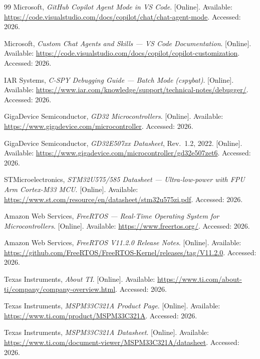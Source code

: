 \documentclass[12pt,a4paper,oneside]{book}
\begin{document}
\begin{thebibliography}{99}
Microsoft, \emph{GitHub Copilot Agent Mode in VS Code}. [Online]. Available: \url{https://code.visualstudio.com/docs/copilot/chat/chat-agent-mode}. Accessed: 2026.

Microsoft, \emph{Custom Chat Agents and Skills --- VS Code Documentation}. [Online]. Available: \url{https://code.visualstudio.com/docs/copilot/copilot-customization}. Accessed: 2026.

IAR Systems, \emph{C-SPY Debugging Guide --- Batch Mode (cspybat)}. [Online]. Available: \url{https://www.iar.com/knowledge/support/technical-notes/debugger/}. Accessed: 2026.


GigaDevice Semiconductor, \emph{GD32 Microcontrollers}. [Online]. Available: \url{https://www.gigadevice.com/microcontroller}. Accessed: 2026.

GigaDevice Semiconductor, \emph{GD32E507xx Datasheet}, Rev.~1.2, 2022. [Online]. Available: \url{https://www.gigadevice.com/microcontroller/gd32e507zet6}. Accessed: 2026.

STMicroelectronics, \emph{STM32U575/585 Datasheet --- Ultra-low-power with FPU Arm Cortex-M33 MCU}. [Online]. Available: \url{https://www.st.com/resource/en/datasheet/stm32u575zi.pdf}. Accessed: 2026.

Amazon Web Services, \emph{FreeRTOS --- Real-Time Operating System for Microcontrollers}. [Online]. Available: \url{https://www.freertos.org/}. Accessed: 2026.

Amazon Web Services, \emph{FreeRTOS V11.2.0 Release Notes}. [Online]. Available: \url{https://github.com/FreeRTOS/FreeRTOS-Kernel/releases/tag/V11.2.0}. Accessed: 2026.


Texas Instruments, \emph{About TI}. [Online]. Available: \url{https://www.ti.com/about-ti/company/company-overview.html}. Accessed: 2026.

Texas Instruments, \emph{MSPM33C321A Product Page}. [Online]. Available: \url{https://www.ti.com/product/MSPM33C321A}. Accessed: 2026.

Texas Instruments, \emph{MSPM33C321A Datasheet}. [Online]. Available: \url{https://www.ti.com/document-viewer/MSPM33C321A/datasheet}. Accessed: 2026.


\end{thebibliography}
\end{document}
